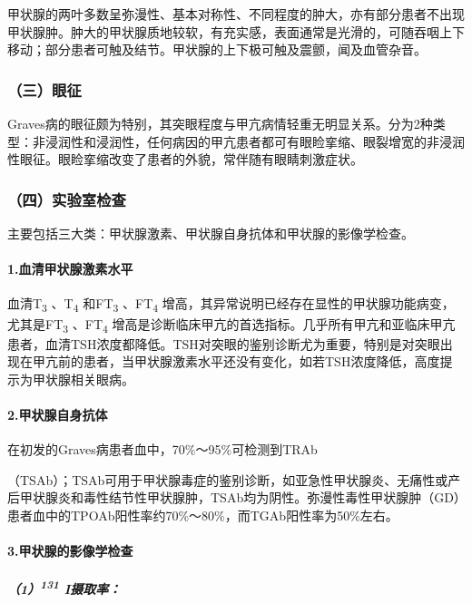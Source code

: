 甲状腺的两叶多数呈弥漫性、基本对称性、不同程度的肿大，亦有部分患者不出现甲状腺肿。肿大的甲状腺质地较软，有充实感，表面通常是光滑的，可随吞咽上下移动；部分患者可触及结节。甲状腺的上下极可触及震颤，闻及血管杂音。

\subsubsection{（三）眼征}

Graves病的眼征颇为特别，其突眼程度与甲亢病情轻重无明显关系。分为2种类型：非浸润性和浸润性，任何病因的甲亢患者都可有眼睑挛缩、眼裂增宽的非浸润性眼征。眼睑挛缩改变了患者的外貌，常伴随有眼睛刺激症状。

\subsubsection{（四）实验室检查}

主要包括三大类：甲状腺激素、甲状腺自身抗体和甲状腺的影像学检查。

\paragraph{1.血清甲状腺激素水平}

血清T\textsubscript{3} 、T\textsubscript{4} 和FT\textsubscript{3}
、FT\textsubscript{4}
增高，其异常说明已经存在显性的甲状腺功能病变，尤其是FT\textsubscript{3}
、FT\textsubscript{4}
增高是诊断临床甲亢的首选指标。几乎所有甲亢和亚临床甲亢患者，血清TSH浓度都降低。TSH对突眼的鉴别诊断尤为重要，特别是对突眼出现在甲亢前的患者，当甲状腺激素水平还没有变化，如若TSH浓度降低，高度提示为甲状腺相关眼病。

\paragraph{2.甲状腺自身抗体}

在初发的Graves病患者血中，70\%～95\%可检测到TRAb

（TSAb）；TSAb可用于甲状腺毒症的鉴别诊断，如亚急性甲状腺炎、无痛性或产后甲状腺炎和毒性结节性甲状腺肿，TSAb均为阴性。弥漫性毒性甲状腺肿（GD）患者血中的TPOAb阳性率约70\%～80\%，而TGAb阳性率为50\%左右。

\paragraph{3.甲状腺的影像学检查}

\subparagraph{（1）\textsuperscript{131} I摄取率：}

